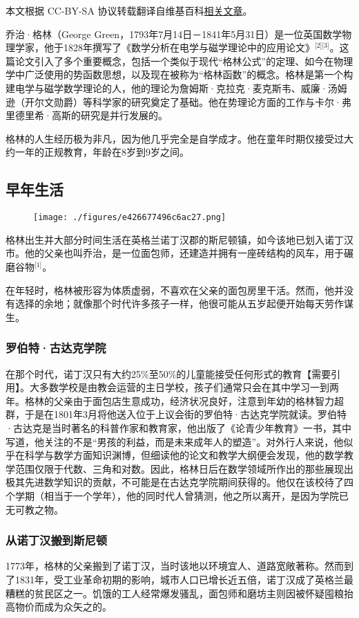 
本文根据 CC-BY-SA 协议转载翻译自维基百科\href{https://en.wikipedia.org/wiki/George_Green_(mathematician)}{相关文章}。

乔治·格林（George Green，1793年7月14日－1841年5月31日）是一位英国数学物理学家，他于1828年撰写了《数学分析在电学与磁学理论中的应用论文》\(^\text{[2][3]}\)。这篇论文引入了多个重要概念，包括一个类似于现代“格林公式”的定理、如今在物理学中广泛使用的势函数思想，以及现在被称为“格林函数”的概念。格林是第一个构建电学与磁学数学理论的人，他的理论为詹姆斯·克拉克·麦克斯韦、威廉·汤姆逊（开尔文勋爵）等科学家的研究奠定了基础。他在势理论方面的工作与卡尔·弗里德里希·高斯的研究是并行发展的。

格林的人生经历极为非凡，因为他几乎完全是自学成才。他在童年时期仅接受过大约一年的正规教育，年龄在8岁到9岁之间。
\subsection{早年生活}
\begin{figure}[ht]
\centering
\texttt{[image: ./figures/e426677496c6ac27.png]}
\caption{} \label{fig_QZgl_1}
\end{figure}
格林出生并大部分时间生活在英格兰诺丁汉郡的斯尼顿镇，如今该地已划入诺丁汉市。他的父亲也叫乔治，是一位面包师，还建造并拥有一座砖结构的风车，用于碾磨谷物\(^\text{[1]}\)。

在年轻时，格林被形容为体质虚弱，不喜欢在父亲的面包房里干活。然而，他并没有选择的余地；就像那个时代许多孩子一样，他很可能从五岁起便开始每天劳作谋生。
\subsubsection{罗伯特·古达克学院}
在那个时代，诺丁汉只有大约25\%至50\%的儿童能接受任何形式的教育【需要引用】。大多数学校是由教会运营的主日学校，孩子们通常只会在其中学习一到两年。格林的父亲由于面包店生意成功，经济状况良好，注意到年幼的格林智力超群，于是在1801年3月将他送入位于上议会街的罗伯特·古达克学院就读。罗伯特·古达克是当时著名的科普作家和教育家，他出版了《论青少年教育》一书，其中写道，他关注的不是“男孩的利益，而是未来成年人的塑造”。对外行人来说，他似乎在科学与数学方面知识渊博，但细读他的论文和教学大纲便会发现，他的数学教学范围仅限于代数、三角和对数。因此，格林日后在数学领域所作出的那些展现出极其先进数学知识的贡献，不可能是在古达克学院期间获得的。他仅在该校待了四个学期（相当于一个学年），他的同时代人曾猜测，他之所以离开，是因为学院已无可教之物。
\subsubsection{从诺丁汉搬到斯尼顿}
1773年，格林的父亲搬到了诺丁汉，当时该地以环境宜人、道路宽敞著称。然而到了1831年，受工业革命初期的影响，城市人口已增长近五倍，诺丁汉成了英格兰最糟糕的贫民区之一。饥饿的工人经常爆发骚乱，面包师和磨坊主则因被怀疑囤粮抬高物价而成为众矢之的。


